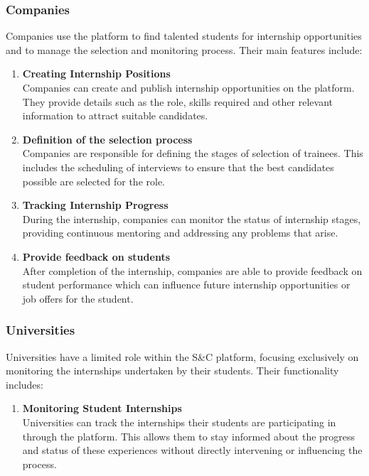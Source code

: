     \subsubsection{Companies}
    Companies use the platform to find talented students for internship opportunities and to manage the selection and monitoring process. Their main features include:
    \begin{enumerate}[label=\textbullet, itemsep=0em]
        \item \textbf{Creating Internship Positions}
        \\ Companies can create and publish internship opportunities on the platform. They provide details such as the role, skills required and other relevant information to attract suitable candidates.

        \item \textbf{Definition of the selection process}
        \\ Companies are responsible for defining the stages of selection of trainees. This includes the scheduling of interviews to ensure that the best candidates possible are selected for the role.

        \item  \textbf{Tracking Internship Progress}
        \\ During the internship, companies can monitor the status of internship stages, providing continuous mentoring and addressing any problems that arise.

        \item \textbf{Provide feedback on students}
        \\ After completion of the internship, companies are able to provide feedback on student performance which can influence future internship opportunities or job offers for the student.
    \end{enumerate}
    
    \subsubsection{Universities}
    Universities have a limited role within the S\&C platform, focusing exclusively on monitoring the internships undertaken by their students. Their functionality includes:
    \begin{enumerate}[label=\textbullet, itemsep=0em]
        \item \textbf{Monitoring Student Internships}
        \\ Universities can track the internships their students are participating in through the platform. This allows them to stay informed about the progress and status of these experiences without directly intervening or influencing the process.
    \end{enumerate}
    
